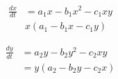 \documentclass[12pt]{article}
\begin{document}
\begin{itemize}
    \begin{equation}
      \begin{split}
        \frac{dx}{dt} & = a_1x-b_1x^2-c_1xy \\
        & x(a_1-b_1x-c_1y)
      \end{split}
      \label{15}
    \end{equation}

    \begin{equation}
      \begin{split}
        \frac{dy}{dt} & = a_2y-b_2y^2-c_2xy \\
        & = y(a_2-b_2y-c_2x)
      \end{split}
      \label{16}
    \end{equation}

\end{itemize}
\end{document}

